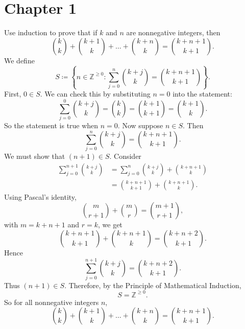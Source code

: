 
\section{Chapter 1}

\begin{problem}[Induction]{
    Use induction to prove that if $k$ and $n$ are nonnegative integers, then
    \[
        \binom{k}{k}+\binom{k+1}{k}+\dots+\binom{k+n}{k}=\binom{k+n+1}{k+1}.
    \]
}
    We define
    \[
        S\coloneqq \left\{ n\in\mathbb{Z}^{\geq 0} : \sum_{j=0}^{n}\binom{k+j}{k}=\binom{k+n+1}{k+1}\right\}.
    \]
    First, $0\in S$.
    We can check this by substituting $n=0$ into the statement:
    \[
        \sum_{j=0}^{0}\binom{k+j}{k}=\binom{k}{k}=\binom{k+1}{k+1}=\binom{k+1}{k}.
    \]
    So the statement is true when $n=0$.
    Now suppose $n\in S$.
    Then
    \[
        \sum_{j=0}^{n}\binom{k+j}{k}=\binom{k+n+1}{k+1}.
    \]
    We must show that $(n+1)\in S$.
    Consider
    \begin{align*}
        \sum_{j=0}^{n+1}\binom{k+j}{k}
        &=
        \sum_{j=0}^{n}\binom{k+j}{k}+\binom{k+n+1}{k}\\
        &=
        \binom{k+n+1}{k+1}+\binom{k+n+1}{k}.
    \end{align*}
    Using Pascal's identity,
    \[
        \binom{m}{r+1}+\binom{m}{r}=\binom{m+1}{r+1},
    \]
    with $m=k+n+1$ and $r=k$, we get
    \[
        \binom{k+n+1}{k+1}+\binom{k+n+1}{k}=\binom{k+n+2}{k+1}.
    \]
    Hence
    \[
        \sum_{j=0}^{n+1}\binom{k+j}{k}=\binom{k+n+2}{k+1}.
    \]
    Thus $(n+1)\in S$.
    Therefore, by the Principle of Mathematical Induction,
    \[
        S=\mathbb{Z}^{\geq 0}.
    \]
    So for all nonnegative integers $n$,
    \[
        \binom{k}{k}+\binom{k+1}{k}+\dots+\binom{k+n}{k}=\binom{k+n+1}{k+1}.
    \]
\end{problem}